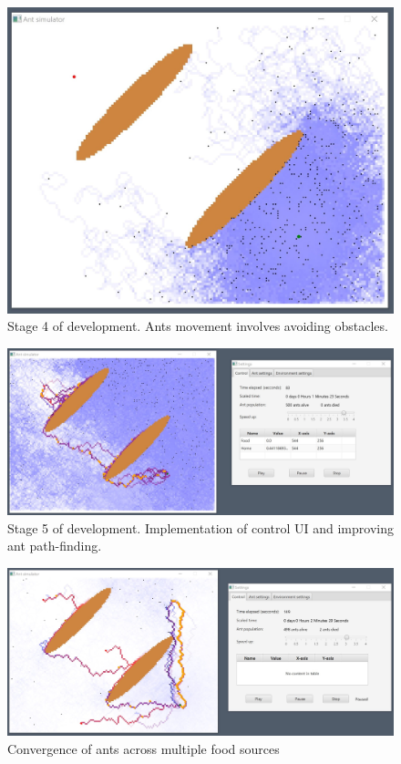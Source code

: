 \documentclass[a4paper, oneside, 11pt]{report}
\begin{document}
\begin{figure}[htb]
	\begin{center}
		\includegraphics[width=0.65 \columnwidth]{Stage_4.jpg}
		\caption{Stage 4 of development. Ants movement involves avoiding obstacles.}
		\label{fig:Stage 4}
	\end{center}
\end{figure}

\begin{figure}[htb]
	\begin{center}
		\includegraphics[width=1.0 \columnwidth]{Stage_5.jpg}
		\caption{Stage 5 of development. Implementation of control UI and improving ant path-finding.}
		\label{fig:Stage 5}
	\end{center}
\end{figure}

\begin{figure}[htb]
	\begin{center}
		\includegraphics[width=1.0 \columnwidth]{Ant_Sim_Convergence.jpg}
		\caption{Convergence of ants across multiple food sources}
		\label{fig:Ant_Convergence}
	\end{center}
\end{figure}
\end{document}
